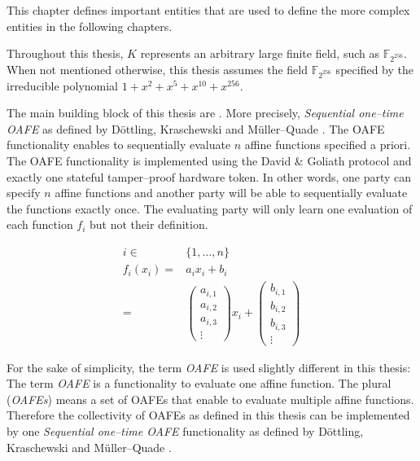 %
%
\label{sec:rae-definitions}

This chapter defines important entities that are used to define the more complex
entities in the following chapters.

\label{sec:field}

\label{def:field} Throughout this thesis, $K$ represents an arbitrary large
finite field, such as $\mathbb{F}_{2^{256}}$.  When not mentioned otherwise,
this thesis assumes the field $\mathbb{F}_{2^{256}}$ specified by the
irreducible polynomial $1 + x^2 + x^5 + x^{10} + x^{256}$.



The main building block of this thesis are . More precisely, \emph{Sequential one--time OAFE} as
defined by Döttling, Kraschewski and Müller--Quade \cite{davidgoliath}. The OAFE
functionality enables to sequentially evaluate $n$ affine functions specified a
priori. The OAFE functionality is implemented using the David \& Goliath
protocol and exactly one stateful tamper--proof hardware token. In other words,
one party can specify $n$ affine functions and another party will be able to
sequentially evaluate the functions exactly once. The evaluating
party will only learn one evaluation of each function $f_i$ but not their
definition.

\begin{align*}
  i \in& \{1, \ldots, n\}\\
%
  f_i(x_i) = &
  a_ix_i + b_i \\
%
  = &
\begin{pmatrix}a_{i,1}\\a_{i,2}\\a_{i,3}\\\vdots\end{pmatrix}x_i +
\begin{pmatrix}b_{i,1}\\b_{i,2}\\b_{i,3}\\\vdots\end{pmatrix}
\end{align*}

\noindent{}For the sake of simplicity, the term \emph{OAFE} is used slightly
different in this thesis: The term \emph{OAFE} is a functionality to evaluate
one affine function. The plural (\emph{OAFEs}) means a set of OAFEs that enable
to evaluate multiple affine functions. Therefore the collectivity of OAFEs as
defined in this thesis can be implemented by one \emph{Sequential one--time
OAFE} functionality as defined by Döttling, Kraschewski and Müller--Quade
\cite{davidgoliath}.


